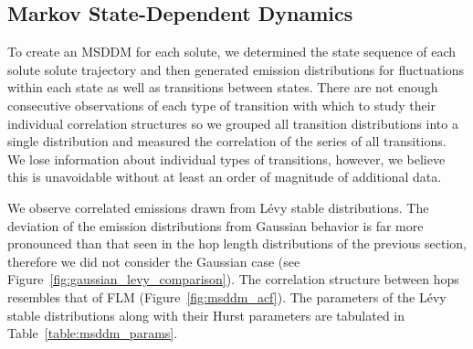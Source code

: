 \documentclass{article}
\begin{document}


  \subsection{Markov State-Dependent Dynamics}\label{section:msm_results}
  
  
  To create an MSDDM for each solute, we determined the state sequence of each 
  solute solute trajectory and then generated emission distributions for fluctuations
  within each state as well as transitions between states. There are not enough 
  consecutive observations of each type of transition with which to study their 
  individual correlation structures so we grouped all transition distributions
  into a single distribution and measured the correlation of the series of all 
  transitions. We lose information about individual types of transitions, however, 
  we believe this is unavoidable without at least an order of magnitude of additional data.
  
  We observe correlated emissions drawn from L\'evy stable distributions. The 
  deviation of the emission distributions from Gaussian behavior is far more pronounced
  than that seen in the hop length distributions of the previous section, therefore we 
  did not consider the Gaussian case (see Figure~\ref{fig:gaussian_levy_comparison}).
  The correlation structure between hops resembles that of FLM (Figure~\ref{fig:msddm_acf}).
  The parameters of the L\'evy stable distributions along with their Hurst parameters 
  are tabulated in Table~\ref{table:msddm_params}. 
  
\end{document}
